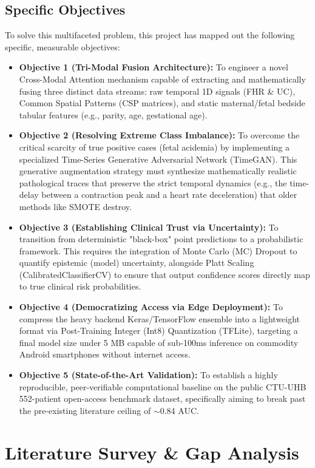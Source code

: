 \documentclass[12pt,a4paper]{report}
\begin{document}
\section{Specific Objectives}
To solve this multifaceted problem, this project has mapped out the following specific, measurable objectives:

\begin{itemize}
    \item \textbf{Objective 1 (Tri-Modal Fusion Architecture):} To engineer a novel Cross-Modal Attention mechanism capable of extracting and mathematically fusing three distinct data streams: raw temporal 1D signals (FHR \& UC), Common Spatial Patterns (CSP matrices), and static maternal/fetal bedside tabular features (e.g., parity, age, gestational age).
    \item \textbf{Objective 2 (Resolving Extreme Class Imbalance):} To overcome the critical scarcity of true positive cases (fetal acidemia) by implementing a specialized Time-Series Generative Adversarial Network (TimeGAN). This generative augmentation strategy must synthesize mathematically realistic pathological traces that preserve the strict temporal dynamics (e.g., the time-delay between a contraction peak and a heart rate deceleration) that older methods like SMOTE destroy.
    \item \textbf{Objective 3 (Establishing Clinical Trust via Uncertainty):} To transition from deterministic "black-box" point predictions to a probabilistic framework. This requires the integration of Monte Carlo (MC) Dropout to quantify epistemic (model) uncertainty, alongside Platt Scaling (CalibratedClassifierCV) to ensure that output confidence scores directly map to true clinical risk probabilities.
    \item \textbf{Objective 4 (Democratizing Access via Edge Deployment):} To compress the heavy backend Keras/TensorFlow ensemble into a lightweight format via Post-Training Integer (Int8) Quantization (TFLite), targeting a final model size under 5 MB capable of sub-100ms inference on commodity Android smartphones without internet access.
    \item \textbf{Objective 5 (State-of-the-Art Validation):} To establish a highly reproducible, peer-verifiable computational baseline on the public CTU-UHB 552-patient open-access benchmark dataset, specifically aiming to break past the pre-existing literature ceiling of $\sim$0.84 AUC.
\end{itemize}

\chapter{Literature Survey \& Gap Analysis}
\end{document}
